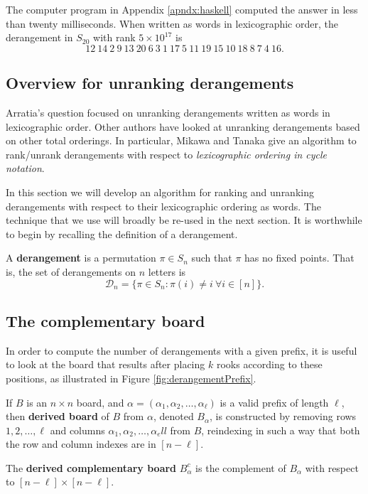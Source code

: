 \begin{answer}
The computer program in Appendix \ref{apndx:haskell} computed the answer in
less than twenty milliseconds. When written as words in lexicographic order, the
derangement in $S_{20}$ with rank $5 \times 10^{17}$ is \begin{equation}
  12\ 14\ 2\ 9\ 13\ 20\ 6\ 3\ 1\ 17\ 5\ 11\ 19\ 15\ 10\ 18\ 8\ 7\ 4\ 16.
\end{equation}
\end{answer}

\subsection{Overview for unranking derangements}
Arratia's question focused on unranking derangements written as words in
lexicographic order.
Other authors have looked at unranking derangements based on other total
orderings. In particular, Mikawa and Tanaka \cite{Mikawa2014} give an algorithm
to rank/unrank derangements
with respect to \textit{lexicographic ordering in cycle notation}.

In this section we will develop an algorithm for ranking and unranking
derangements with respect to their lexicographic ordering as words. The
technique that we use will broadly be re-used in the next section.
It is worthwhile to begin by recalling the definition of a derangement.
\begin{definition}
  A \textbf{derangement} is a permutation $\pi \in S_n$ such that $\pi$ has no
  fixed points. That is, the set of derangements on $n$ letters is \begin{equation}
    \mathcal{D}_n = \{\pi \in S_n : \pi(i) \neq i\ \forall i \in [n]\}.
  \end{equation}
\end{definition}

\subsection{The complementary board}
In order to compute the number of derangements with a given prefix, it is
useful to look at the board that results after placing $k$ rooks according to
these positions, as illustrated in Figure \ref{fig:derangementPrefix}.



\begin{definition}
  If $B$ is an $n \times n$ board, and
  $\alpha = (\alpha_1, \alpha_2, \dots, \alpha_\ell)$ is a valid prefix of length
  $\ell$, then \textbf{derived board} of $B$ from $\alpha$,
  denoted $B_\alpha$,
  is constructed by removing
  rows $1, 2, \dots, \ell$ and
  columns $\alpha_1, \alpha_2, \dots, \alpha_ell$ from $B$,
  reindexing in such a way that both the row and column indexes are in
  $[n - \ell]$.

  The \textbf{derived complementary board} $B_\alpha^c$ is the complement of
  $B_\alpha$ with respect to $[n - \ell] \times [n - \ell]$.
\end{definition}

